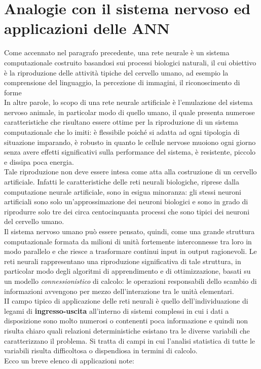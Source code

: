 \documentclass[12pt,a4paper,oneside]{book}
\begin{document}
		
		
		
		\section{Analogie con il sistema nervoso ed applicazioni delle ANN}
	
		Come accennato nel paragrafo precedente, una rete neurale è un sistema computazionale costruito basandosi sui processi biologici naturali, il cui obiettivo è la riproduzione delle attività tipiche del cervello umano, ad esempio la comprensione del linguaggio, la percezione di immagini, il riconoscimento di forme  \\
		In altre parole, lo scopo di una rete neurale artificiale è l’emulazione del sistema nervoso animale, in particolar modo di quello umano, il quale presenta numerose caratteristiche che risultano essere ottime per la riproduzione di un sistema computazionale che lo imiti: è flessibile poiché si adatta ad ogni tipologia di situazione imparando, è robusto in quanto le cellule nervose muoiono ogni giorno senza avere effetti significativi sulla performance del sistema, è resistente, piccolo e dissipa poca energia. \\
		Tale riproduzione non deve essere intesa come atta alla costruzione di un cervello artificiale. Infatti le caratteristiche delle reti neurali biologiche, riprese dalla computazione neurale artificiale, sono in esigua minoranza: gli stessi neuroni artificiali sono solo un’approssimazione dei neuroni biologici e sono in grado di riprodurre solo tre dei circa centocinquanta processi che sono tipici dei neuroni del cervello umano.\\
		Il sistema nervoso umano può essere pensato, quindi, come una grande struttura computazionale formata da milioni di unità fortemente interconnesse tra loro in modo parallelo e che riesce a trasformare continui input in output ragionevoli. Le reti neurali rappresentano una riproduzione significativa di tale struttura, in particolar modo degli algoritmi di apprendimento e di ottimizzazione, basati su un modello \emph{connessionistico} di calcolo: le operazioni responsabili dello scambio di informazioni avvengono per mezzo dell'interazione tra le unità elementari.\\
		II campo tipico di applicazione delle reti neurali è quello dell'individuazione di legami di \textbf{ingresso-uscita} all'interno di sistemi complessi in cui i dati a disposizione sono molto 
		numerosi o contenenti poca informazione e quindi non risulta chiaro quali relazioni deterministiche esistano tra le diverse variabili che caratterizzano il problema. Si tratta di campi in cui l'analisi statistica di tutte le variabili risulta difficoltosa o dispendiosa in termini di calcolo.\\ 
		Ecco un breve elenco di applicazioni note:
		
\end{document}
